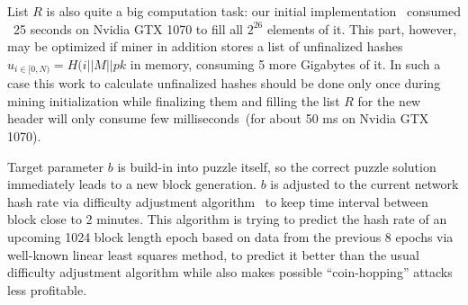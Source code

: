List $R$ is also quite a big computation task: our initial implementation~\cite{ergoMiner}
consumed ~25 seconds on Nvidia GTX 1070 to fill all $2^{26}$ elements of it.
This part, however, may be optimized if miner in addition stores a list of unfinalized hashes $u_{i \in [0,N)}=H(i||M||pk$
in memory, consuming 5 more Gigabytes of it. In such a case this work to calculate unfinalized hashes should
be done only once during mining initialization while finalizing them and filling the list $R$
for the new header will only consume few milliseconds~(for about 50 ms on Nvidia GTX 1070).

Target parameter $b$ is build-in into puzzle itself, so the correct puzzle solution immediately
leads to a new block generation. $b$ is adjusted to the current network hash rate via difficulty adjustment
algorithm~\cite{meshkov2017short} to keep time interval between block close to 2 minutes.
This algorithm is trying to predict the hash rate of an upcoming 1024 block length epoch
based on data from the previous 8 epochs via well-known linear least squares method,
to predict it better than the usual difficulty adjustment algorithm while also makes possible
``coin-hopping'' attacks less profitable.
